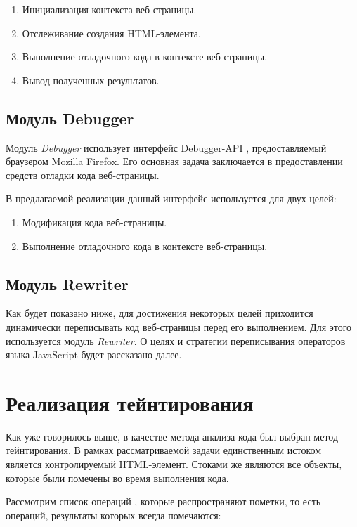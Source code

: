 	\begin{enumerate}
		\item Инициализация контекста веб-страницы.
		\item Отслеживание создания HTML-элемента.
		\item Выполнение отладочного кода в контексте веб-страницы.
		\item Вывод полученных результатов.
	\end{enumerate}

\subsection{Модуль Debugger}
	Модуль \textit{Debugger} использует интерфейс Debugger-API \cite{debuggerapi}, предоставляемый браузером Mozilla Firefox. Его основная задача заключается в предоставлении средств отладки кода веб-страницы.


	В предлагаемой реализации данный интерфейс используется для двух целей:


	\begin{enumerate}
		\item Модификация кода веб-страницы.
		\item Выполнение отладочного кода в контексте веб-страницы.
	\end{enumerate}

\subsection{Модуль Rewriter}
	Как будет показано ниже, для достижения некоторых целей приходится динамически переписывать код веб-страницы перед его выполнением. Для этого используется модуль \textit{Rewriter}. О целях и стратегии переписывания операторов языка JavaScript будет рассказано далее.

\section{Реализация тейнтирования}
Как уже говорилось выше, в качестве метода анализа кода был выбран метод тейнтирования. В рамках рассматриваемой задачи единственным истоком является контролируемый HTML-элемент. Стоками же являются все объекты, которые были помечены во время выполнения кода.


Рассмотрим список операций \cite{miller}, которые распространяют пометки, то есть операций, результаты которых всегда помечаются:


